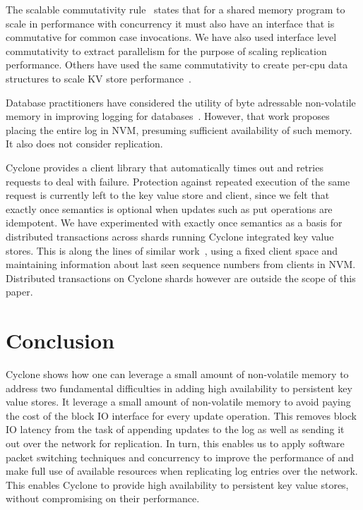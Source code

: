 \documentclass[pageno]{jpaper}
\begin{document}
The scalable commutativity rule~\cite{scalable_commutativity} states that for a
shared memory program to scale in performance with concurrency it must also have
an interface that is commutative for common case invocations. We have also used
interface level commutativity to extract parallelism for the purpose of scaling
replication performance. Others have used the same commutativity to create
per-cpu data structures to scale KV store performance~\cite{flodb}.

Database practitioners have considered the utility of byte adressable
non-volatile memory in improving logging for
databases~\cite{nvram_log}. However, that work proposes placing the entire log
in NVM, presuming sufficient availability of such memory. It also does not
consider replication.

Cyclone provides a client library that automatically times out and retries
requests to deal with failure. Protection against repeated execution of the same
request is currently left to the key value store and client, since we felt that
exactly once semantics is optional when updates such as put operations are
idempotent. We have experimented with exactly once semantics as a basis for
distributed transactions across shards running Cyclone integrated key value
stores. This is along the lines of similar work~\cite{raft_lin}, using a fixed
client space and maintaining information about last seen sequence numbers from
clients in NVM. Distributed transactions on Cyclone shards however are outside
the scope of this paper.

\section{Conclusion}
Cyclone shows how one can leverage a small amount of non-volatile memory to
address two fundamental difficulties in adding high availability to persistent
key value stores. It leverage a small amount of non-volatile memory to avoid
paying the cost of the block IO interface for every update operation. This
removes block IO latency from the task of appending updates to the log as well
as sending it out over the network for replication. In turn, this enables us to
apply software packet switching techniques and concurrency to improve the
performance of and make full use of available resources when replicating log
entries over the network. This enables Cyclone to provide high availability to
persistent key value stores, without compromising on their performance. 
\newcommand\myurl[2]{\url{#1}}


\end{document}
